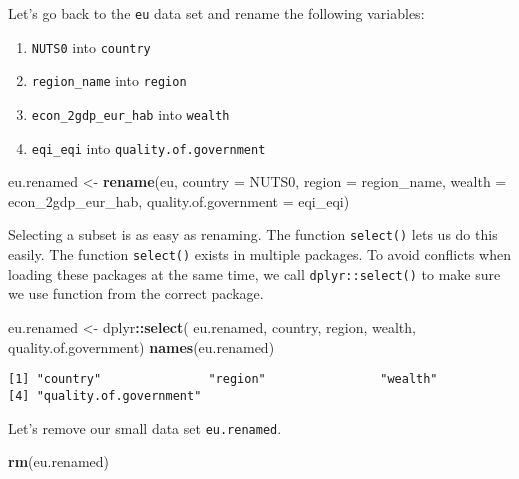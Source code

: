 \documentclass[]{article}
\newenvironment{Shaded}{\begin{snugshade}}{\end{snugshade}}
\newcommand{\DataTypeTok}[1]{\textcolor[rgb]{0.13,0.29,0.53}{#1}}
\newcommand{\KeywordTok}[1]{\textcolor[rgb]{0.13,0.29,0.53}{\textbf{#1}}}
\newcommand{\NormalTok}[1]{#1}
\newcommand{\OperatorTok}[1]{\textcolor[rgb]{0.81,0.36,0.00}{\textbf{#1}}}
\newcommand{\StringTok}[1]{\textcolor[rgb]{0.31,0.60,0.02}{#1}}
\providecommand{\tightlist}{%
  \setlength{\itemsep}{0pt}\setlength{\parskip}{0pt}}
\begin{document}
Let's go back to the \texttt{eu} data set and rename the following variables:

\begin{enumerate}
\def\labelenumi{\arabic{enumi}.}
\tightlist
\item
  \texttt{NUTS0} into \texttt{country}
\item
  \texttt{region\_name} into \texttt{region}
\item
  \texttt{econ\_2gdp\_eur\_hab} into \texttt{wealth}
\item
  \texttt{eqi\_eqi} into \texttt{quality.of.government}
\end{enumerate}

\begin{Shaded}
\begin{Highlighting}[]
\NormalTok{eu.renamed <-}\StringTok{ }\KeywordTok{rename}\NormalTok{(eu,}
                     \DataTypeTok{country =}\NormalTok{ NUTS0,}
                     \DataTypeTok{region =}\NormalTok{ region_name,}
                     \DataTypeTok{wealth =}\NormalTok{ econ_2gdp_eur_hab,}
                     \DataTypeTok{quality.of.government =}\NormalTok{ eqi_eqi)}
\end{Highlighting}
\end{Shaded}

Selecting a subset is as easy as renaming. The function \texttt{select()} lets us do this easily. The function \texttt{select()} exists in multiple packages. To avoid conflicts when loading these packages at the same time, we call \texttt{dplyr::select()} to make sure we use function from the correct package.

\begin{Shaded}
\begin{Highlighting}[]
\NormalTok{eu.renamed <-}\StringTok{ }\NormalTok{dplyr}\OperatorTok{::}\KeywordTok{select}\NormalTok{(}
\NormalTok{  eu.renamed,}
\NormalTok{  country, region, wealth, quality.of.government)}
\KeywordTok{names}\NormalTok{(eu.renamed)}
\end{Highlighting}
\end{Shaded}

\begin{verbatim}
[1] "country"               "region"                "wealth"               
[4] "quality.of.government"
\end{verbatim}

Let's remove our small data set \texttt{eu.renamed}.

\begin{Shaded}
\begin{Highlighting}[]
\KeywordTok{rm}\NormalTok{(eu.renamed)}
\end{Highlighting}
\end{Shaded}
\end{document}
